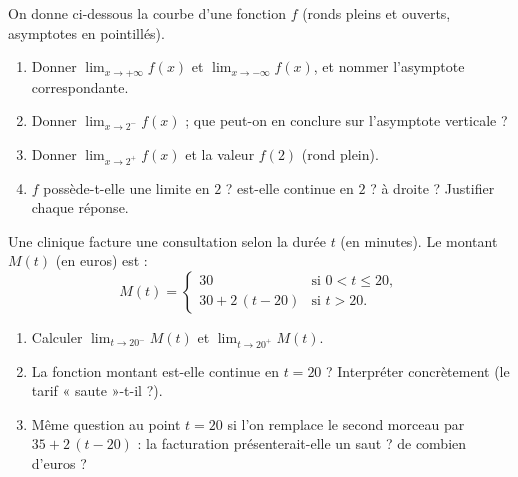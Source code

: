 \documentclass[11pt,a4paper]{article}
\begin{document}
\begin{exercice}
On donne ci-dessous la courbe d'une fonction $f$ (ronds pleins et ouverts, asymptotes en pointillés).
\begin{center}
\end{center}
\begin{enumerate}[label=\alph*),leftmargin=2em,itemsep=3pt]
  \item Donner $\displaystyle\lim_{x\to +\infty} f(x)$ et $\displaystyle\lim_{x\to -\infty} f(x)$, et nommer l'asymptote correspondante.
  \item Donner $\displaystyle\lim_{x\to 2^{-}} f(x)$ ; que peut-on en conclure sur l'asymptote verticale ?
  \item Donner $\displaystyle\lim_{x\to 2^{+}} f(x)$ et la valeur $f(2)$ (rond plein).
  \item $f$ possède-t-elle une limite en $2$ ? est-elle continue en $2$ ? à droite ? Justifier chaque réponse.
\end{enumerate}
\end{exercice}

\begin{exercice}
Une clinique facture une consultation selon la durée $t$ (en minutes). Le montant $M(t)$ (en euros) est :
\[ M(t)=\begin{cases} 30 & \text{si } 0< t\leq 20,\\[2pt] 30+2\,(t-20) & \text{si } t>20.\end{cases} \]
\begin{enumerate}[label=\alph*),leftmargin=2em,itemsep=3pt]
  \item Calculer $\displaystyle\lim_{t\to 20^{-}} M(t)$ et $\displaystyle\lim_{t\to 20^{+}} M(t)$.
  \item La fonction montant est-elle continue en $t=20$ ? Interpréter concrètement (le tarif « saute »-t-il ?).
  \item Même question au point $t=20$ si l'on remplace le second morceau par $35+2\,(t-20)$ :
        la facturation présenterait-elle un saut ? de combien d'euros ?
\end{enumerate}
\end{exercice}
\end{document}
